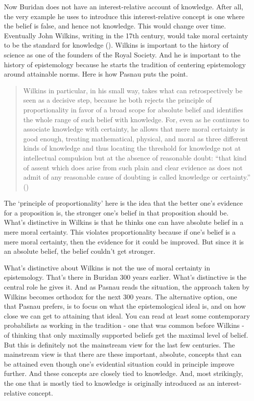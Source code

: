 \documentclass[
  10pt,
  letterpaper,
  twoside]{scrbook}
\begin{document}
Now Buridan does not have an interest-relative account of knowledge.
After all, the very example he uses to introduce this interest-relative
concept is one where the belief is false, and hence not knowledge. This
would change over time. Eventually John Wilkins, writing in the 17th
century, would take moral certainty to be the standard for knowledge
(). Wilkins is important to
the history of science as one of the founders of the Royal Society. And
he is important to the history of epistemology because he starts the
tradition of centering epistemology around attainable norms. Here is how
Pasnau puts the point.

\begin{quote}
Wilkins in particular, in his small way, takes what can retrospectively
be seen as a decisive step, because he both rejects the principle of
proportionality in favor of a broad scope for absolute belief and
identifies the whole range of such belief with knowledge. For, even as
he continues to associate knowledge with certainty, he allows that mere
moral certainty is good enough, treating mathematical, physical, and
moral as three different kinds of knowledge and thus locating the
threshold for knowledge not at intellectual compulsion but at the
absence of reasonable doubt: ``that kind of assent which does arise from
such plain and clear evidence as does not admit of any reasonable cause
of doubting is called knowledge or certainty.''
()
\end{quote}

The `principle of proportionality' here is the idea that the better
one's evidence for a proposition is, the stronger one's belief in that
proposition should be. What's distinctive in Wilkins is that he thinks
one can have absolute belief in a mere moral certainty. This violates
proportionality because if one's belief is a mere moral certainty, then
the evidence for it could be improved. But since it is an absolute
belief, the belief couldn't get stronger.

What's distinctive about Wilkins is not the use of moral certainty in
epistemology. That's there in Buridan 300 years earlier. What's
distinctive is the central role he gives it. And as Pasnau reads the
situation, the approach taken by Wilkins becomes orthodox for the next
300 years. The alternative option, one that Pasnau prefers, is to focus
on what the epistemological ideal is, and on how close we can get to
attaining that ideal. You can read at least some contemporary
probabilists as working in the tradition - one that was common before
Wilkins - of thinking that only maximally supported beliefs get the
maximal level of belief. But this is definitely not the mainstream view
for the last few centuries. The mainstream view is that there are these
important, absolute, concepts that can be attained even though one's
evidential situation could in principle improve further. And these
concepts are closely tied to knowledge. And, most strikingly, the one
that is mostly tied to knowledge is originally introduced as an
interest-relative concept.
\end{document}
